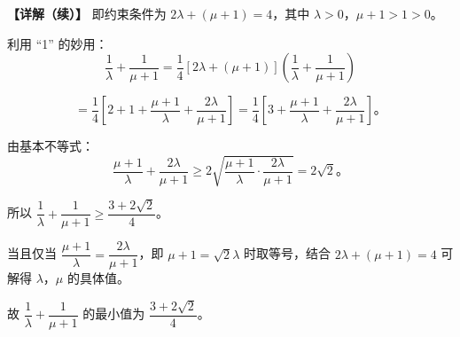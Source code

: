 \documentclass[UTF8,10pt,aspectratio=169]{ctexbeamer}
\begin{document}
	\begin{frame}
		\textbf{【详解（续）】} 即约束条件为 $2\lambda + (\mu + 1) = 4$，其中 $\lambda > 0$，$\mu + 1 > 1 > 0$。
		
		\vspace{0.3cm}
		利用 “1” 的妙用：
		$$\dfrac{1}{\lambda} + \dfrac{1}{\mu + 1} = \dfrac{1}{4}\left[2\lambda + (\mu+1)\right]\left(\dfrac{1}{\lambda} + \dfrac{1}{\mu+1}\right)$$
		
		\vspace{0.1cm}
		$$= \dfrac{1}{4}\left[2 + 1 + \dfrac{\mu+1}{\lambda} + \dfrac{2\lambda}{\mu+1}\right] = \dfrac{1}{4}\left[3 + \dfrac{\mu+1}{\lambda} + \dfrac{2\lambda}{\mu+1}\right]。$$
		
		\vspace{0.2cm}
		由基本不等式：
		$$\dfrac{\mu+1}{\lambda} + \dfrac{2\lambda}{\mu+1} \geq 2\sqrt{\dfrac{\mu+1}{\lambda} \cdot \dfrac{2\lambda}{\mu+1}} = 2\sqrt{2}。$$
		
		\vspace{0.2cm}
		所以 $\dfrac{1}{\lambda} + \dfrac{1}{\mu + 1} \geq \dfrac{3 + 2\sqrt{2}}{4}$。
		
		\vspace{0.1cm}
		当且仅当 $\dfrac{\mu+1}{\lambda} = \dfrac{2\lambda}{\mu+1}$，即 $\mu + 1 = \sqrt{2}\lambda$ 时取等号，结合 $2\lambda + (\mu+1) = 4$ 可解得 $\lambda$，$\mu$ 的具体值。
		
		\vspace{0.2cm}
		故 $\dfrac{1}{\lambda} + \dfrac{1}{\mu + 1}$ 的最小值为 $\boxed{\dfrac{3 + 2\sqrt{2}}{4}}$。
	\end{frame}
	
\end{document}
